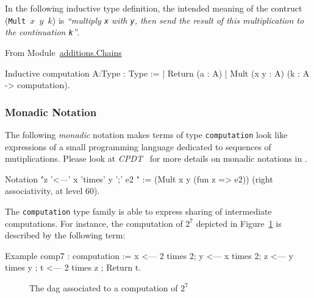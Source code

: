   In the following inductive type definition, the intended meaning 
  of the contruct (\texttt{Mult $x$ $y$ $k$})  is \emph{``multiply \texttt{x} with 
\texttt{y}, then send  the result of this multiplication to 
  the continuation  \texttt{k}''}.



From Module~\href{../theories/html/hydras.additions.Chains.html}{additions.Chains}

\begin{Coqsrc}
Inductive computation {A:Type}  : Type :=
| Return (a : A)
| Mult (x y : A) (k : A -> computation).    
\end{Coqsrc}
\subsubsection{Monadic Notation}


The following \emph{monadic} 
notation makes terms of type \texttt{computation} look like
expressions of a small programming language dedicated to sequences of mutiplications.
Please look at \emph{CPDT}~\cite{chlipalacpdt2011} for more details on monadic notations in \coq.

\begin{Coqsrc}
Notation "z '<---'  x 'times' y ';' e2 " :=
  (Mult x y  (fun z => e2))
    (right associativity, at level 60).
\end{Coqsrc}

The \texttt{computation} type family is able to express sharing of intermediate computations. For instance, the computation of $2^7$ depicted in Figure~\ref{fig:dag7} is described by  the following term:

\begin{Coqsrc}
Example comp7 : computation  :=
  x <--- 2 times 2;
  y <--- x times 2;
  z <--- y times y ;
  t <--- 2 times z ;
  Return t.  
\end{Coqsrc}

\begin{figure}[h]
  \centering
  \caption{The dag associated to a computation of $2^7$}
  \label{fig:dag7}
\end{figure}

